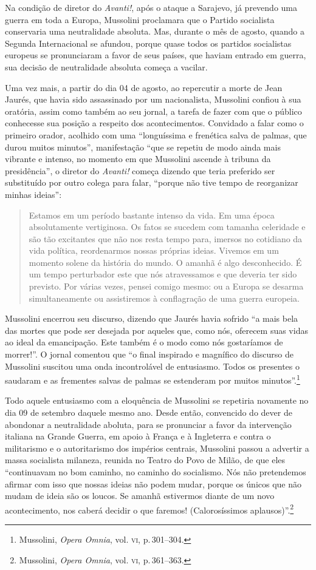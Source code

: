 Na condição de diretor do \emph{Avanti!}, após o ataque a Sarajevo, já
prevendo uma guerra em toda a Europa, Mussolini proclamara que o Partido
socialista conservaria uma neutralidade absoluta. Mas, durante o mês de
agosto, quando a Segunda Internacional se afundou, porque quase todos os
partidos socialistas europeus se pronunciaram a favor de seus países,
que haviam entrado em guerra, sua decisão de neutralidade absoluta
começa a vacilar.

Uma vez mais, a partir do dia 04 de agosto, ao repercutir a morte de
Jean Jaurés, que havia sido assassinado por um nacionalista, Mussolini
confiou à sua oratória, assim como também ao seu jornal, a tarefa de
fazer com que o público conhecesse sua posição a respeito dos
acontecimentos. Convidado a falar como o primeiro orador, acolhido com
uma ``longuíssima e frenética salva de palmas, que durou muitos
minutos'', manifestação ``que se repetiu de modo ainda mais vibrante e
intenso, no momento em que Mussolini ascende à tribuna da presidência'',
o diretor do \emph{Avanti!} começa dizendo que teria preferido ser
substituído por outro colega para falar, ``porque não tive tempo de
reorganizar minhas ideias'':

\begin{quote}
Estamos em um período bastante intenso da vida. Em uma época
absolutamente vertiginosa. Os fatos se sucedem com tamanha celeridade e
são tão excitantes que não nos resta tempo para, imersos no cotidiano da
vida política, reordenarmos nossas próprias ideias. Vivemos em um
momento solene da história do mundo. O amanhã é algo desconhecido. É um
tempo perturbador este que nós atravessamos e que deveria ter sido
previsto. Por várias vezes, pensei comigo mesmo: ou a Europa se desarma
simultaneamente ou assistiremos à conflagração de uma guerra europeia.
\end{quote}

Mussolini encerrou seu discurso, dizendo que Jaurés havia sofrido ``a
mais bela das mortes que pode ser desejada por aqueles que, como nós,
oferecem suas vidas ao ideal da emancipação. Este também é o modo como
nós gostaríamos de morrer!''. O jornal comentou que ``o final inspirado
e magnífico do discurso de Mussolini suscitou uma onda incontrolável de
entusiasmo. Todos os presentes o saudaram e as frementes salvas de
palmas se estenderam por muitos minutos''.\footnote{Mussolini,
  \emph{Opera Omnia}, vol. \textsc{vi}, p.\,301--304.}

Todo aquele entusiasmo com a eloquência de Mussolini se repetiria
novamente no dia 09 de setembro daquele mesmo ano. Desde então,
convencido do dever de abondonar a neutralidade aboluta, para se
pronunciar a favor da intervenção italiana na Grande Guerra, em apoio à
França e à Ingleterra e contra o militarismo e o autoritarismo dos
impérios centrais, Mussolini passou a advertir a massa socialista
milaneza, reunida no Teatro do Povo de Milão, de que eles ``continuavam
no bom caminho, no caminho do socialismo. Nós não pretendemos afirmar
com isso que nossas ideias não podem mudar, porque os únicos que não
mudam de ideia são os loucos. Se amanhã estivermos diante de um novo
acontecimento, nos caberá decidir o que faremos! (Calorosíssimos
aplausos)''.\footnote{Mussolini, \emph{Opera Omnia}, vol. \textsc{vi}, p.\,361--363.}

